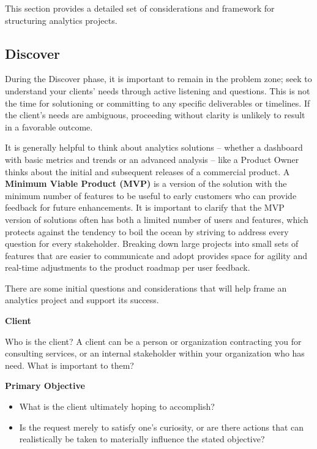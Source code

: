 \documentclass[
]{book}
\providecommand{\tightlist}{%
  \setlength{\itemsep}{0pt}\setlength{\parskip}{0pt}}
\begin{document}
This section provides a detailed set of considerations and framework for structuring analytics projects.

\hypertarget{discover}{%
\subsection{Discover}\label{discover}}

During the Discover phase, it is important to remain in the problem zone; seek to understand your clients' needs through active listening and questions. This is not the time for solutioning or committing to any specific deliverables or timelines. If the client's needs are ambiguous, proceeding without clarity is unlikely to result in a favorable outcome.

It is generally helpful to think about analytics solutions -- whether a dashboard with basic metrics and trends or an advanced analysis -- like a Product Owner thinks about the initial and subsequent releases of a commercial product. A \textbf{Minimum Viable Product (MVP)} is a version of the solution with the minimum number of features to be useful to early customers who can provide feedback for future enhancements. It is important to clarify that the MVP version of solutions often has both a limited number of users and features, which protects against the tendency to boil the ocean by striving to address every question for every stakeholder. Breaking down large projects into small sets of features that are easier to communicate and adopt provides space for agility and real-time adjustments to the product roadmap per user feedback.

There are some initial questions and considerations that will help frame an analytics project and support its success.

\textbf{Client}

Who is the client? A client can be a person or organization contracting you for consulting services, or an internal stakeholder within your organization who has need. What is important to them?

\textbf{Primary Objective}

\begin{itemize}
\tightlist
\item
  What is the client ultimately hoping to accomplish?
\item
  Is the request merely to satisfy one's curiosity, or are there actions that can realistically be taken to materially influence the stated objective?
\end{itemize}
\end{document}
